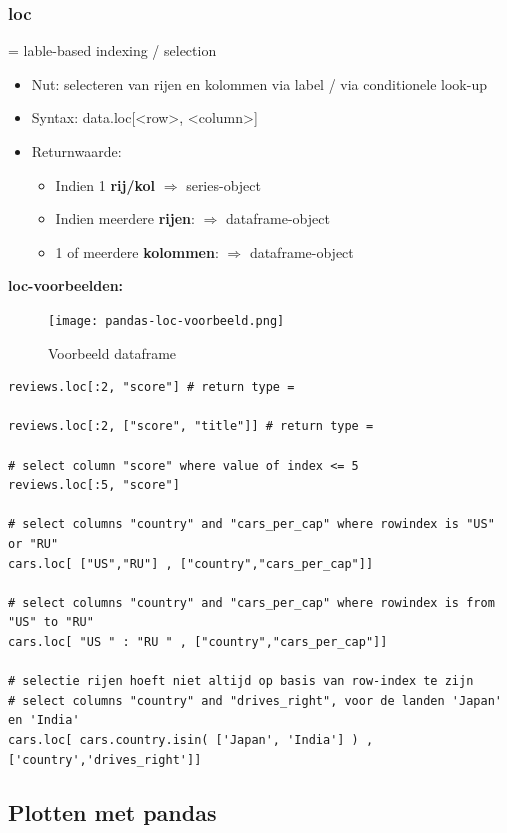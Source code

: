 \documentclass{article}
\begin{document}
\subsubsection{loc}

= lable-based indexing / selection

\begin{itemize}
    \item Nut: selecteren van rijen en kolommen via label / via conditionele look-up
    \item Syntax: data.loc[<row>, <column>]
    \item Returnwaarde:
    \begin{itemize}
        \item Indien 1 \textbf{rij/kol} $\Rightarrow$ series-object
        \item Indien meerdere \textbf{rijen}: $\Rightarrow$ dataframe-object
        \item 1 of meerdere \textbf{kolommen}: $\Rightarrow$ dataframe-object 
    \end{itemize}
\end{itemize}


\textbf{loc-voorbeelden:}

\begin{figure}[H]
    \centering
    \texttt{[image: pandas-loc-voorbeeld.png]}
    \caption{Voorbeeld dataframe}
\end{figure}


\begin{verbatim}
reviews.loc[:2, "score"] # return type = 

reviews.loc[:2, ["score", "title"]] # return type = 

# select column "score" where value of index <= 5
reviews.loc[:5, "score"]

# select columns "country" and "cars_per_cap" where rowindex is "US" or "RU"
cars.loc[ ["US","RU"] , ["country","cars_per_cap"]]

# select columns "country" and "cars_per_cap" where rowindex is from "US" to "RU"
cars.loc[ "US " : "RU " , ["country","cars_per_cap"]]

# selectie rijen hoeft niet altijd op basis van row-index te zijn
# select columns "country" and "drives_right", voor de landen 'Japan' en 'India'
cars.loc[ cars.country.isin( ['Japan', 'India'] ) , ['country','drives_right']]
\end{verbatim}

\subsection{Plotten met pandas}
\end{document}
